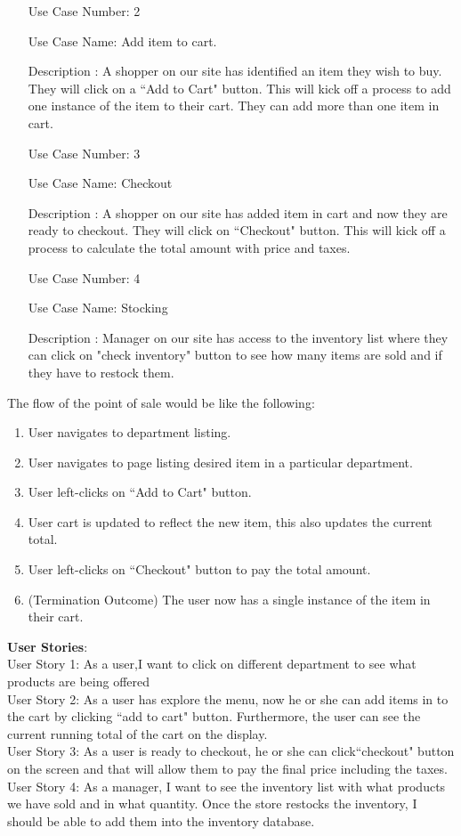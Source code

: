 \documentclass[10pt,conference,onecolumn,compsoc]{IEEEtran}
\begin{document}
\begin{itemize}
\item[Use Case Number:] 2
\item[Use Case Name:] Add item to cart. 
\item[Description]: A shopper on our site has identified an item they wish to buy.  They will click on a ``Add to Cart" button.  This will kick off a process to add one instance of the item to their cart. They can add more than one item in cart. 
\end{itemize}

\begin{itemize}
\item[Use Case Number:] 3
\item[Use Case Name:] Checkout
\item[Description]: A shopper on our site has added item in cart and now they are ready to checkout. They will click on ``Checkout" button. This will kick off a process to calculate the total amount with price and taxes. 
\end{itemize} 

\begin{itemize}
\item[Use Case Number:] 4
\item[Use Case Name:] Stocking
\item[Description]: Manager on our site has access to the inventory list where they can click on "check inventory" button to see how many items are sold and if they have to restock them. 
\end{itemize} 

The flow of the point of sale would be like the following:
\begin{enumerate}
\item User navigates to department listing.
\item User navigates to page listing desired item in a particular department.
\item User left-clicks on ``Add to Cart" button.
\item User cart is updated to reflect the new item, this also updates the current total.
\item User left-clicks on ``Checkout" button to pay the total amount.
\item(Termination Outcome) The user now has a single instance of the item in their cart.
\end{enumerate} 
\textbf{User Stories}:\\
User Story 1: As a user,I want to click on different department to see what products are being offered\\
User Story 2: As a user has explore the menu, now he or she can add items in to the cart by clicking ``add to cart" button. Furthermore, the user can see the current running total of the cart on the display. \\
User Story 3: As a user is ready to checkout, he or she can click``checkout" button on the screen and that will allow them to pay the final price including the taxes.
User Story 4: As a manager, I want to see the inventory list with what products we have sold and in what quantity. Once the store restocks the inventory, I should be able to add them into the inventory database.
\end{document}
